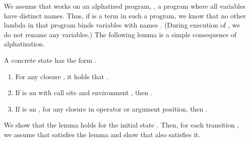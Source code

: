 \documentclass{LMCS}
\theoremstyle{definition} \newtheorem{property}[thm]{Property}
\begin{document}
We assume that \cfat{} works on an alphatized program, \ie, a program where all
variables have distinct names.
Thus, if \anylam{} is a term in such a program, we know that no other lambda in
that program binds variables with names .
(During execution of \cfat, we do not rename any variables.)
The following lemma is a simple consequence of alphatization.
\begin{lem}\label{lem:envs-have-no-junk}
A concrete state \cstat{} has the form .
\begin{enumerate}[\em(1)]
\item
  For any closure , it holds that 
  .
\item
  If \cstat{} is an \deval{} with call site \mcall{} and environment 
  \cbenv, then .
\item
  If \cstat{} is an \dapply, for any closure  in operator or 
  argument position, then .
\end{enumerate}
\end{lem}
\proof
We show that the lemma holds for the initial state \initstate.
Then, for each transition , we assume that \cstat{} 
satisfies the lemma and show that  also satisfies it.
\end{document}
